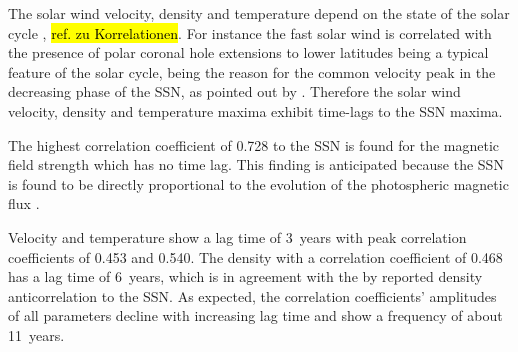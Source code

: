 The solar wind velocity, density and temperature depend on the state of the solar cycle \citep{Schwenn1983}, \hl{ref. zu Korrelationen}. %
For instance the fast solar wind is correlated with the presence of polar coronal hole extensions to lower latitudes being a typical feature of the solar cycle, being the reason for the common velocity peak in the decreasing phase of the SSN, as pointed out by \citet[\hl{Figure~XX, p.~XX}]{Bothmer2007}. Therefore the solar wind velocity, density and temperature maxima exhibit time-lags to the SSN maxima.

The highest correlation coefficient of 0.728 to the SSN is found for the magnetic field strength which has no time lag. This finding is anticipated because the SSN is found to be directly proportional to the evolution of the photospheric magnetic flux \citep{Smith2003}.


Velocity and temperature show a lag time of 3~years with peak correlation coefficients of 0.453 and 0.540. The density with a correlation coefficient of 0.468 has a lag time of 6~years, which is in agreement with the by \citet{Bougeret1984} reported density anticorrelation to the SSN.	%
As expected, the correlation coefficients' amplitudes of all parameters decline with increasing lag time and show a frequency of about 11~years.

